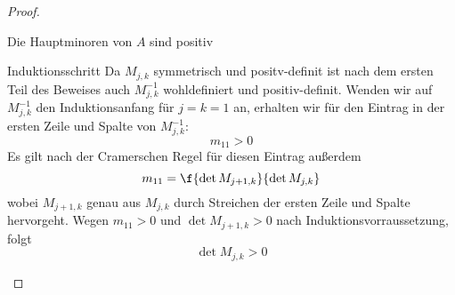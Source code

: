 \documentclass[a4paper]{scrartcl}
\numberwithin{equation}{section}
\begin{document}
\begin{st}
\begin{proof}
\begin{enumerate}
\begin{seg}{Die Hauptminoren von $A$ sind positiv}
\begin{seg}{Induktionsschritt}
					Da $M_{j,k}$ symmetrisch und positv-definit ist nach dem ersten Teil des Beweises auch $M_{j,k}^{-1}$ wohldefiniert und positiv-definit.
					Wenden wir auf $M_{j,k}^{-1}$ den Induktionsanfang für $j=k=1$ an, erhalten wir für den Eintrag in der ersten Zeile und Spalte von $M_{j,k}^{-1}$:
					\[
						m_{11} > 0
					\]
					Es gilt nach der Cramerschen Regel für diesen Eintrag außerdem
					\[
						m_{11} = \f {\det M_{j+1,k}}{\det M_{j,k}}
					\]
					wobei $M_{j+1,k}$ genau aus $M_{j,k}$ durch Streichen der ersten Zeile und Spalte hervorgeht.
					Wegen $m_{11}>0$ und $\det M_{j+1,k} > 0$ nach Induktionsvorraussetzung, folgt
					\[
						\det M_{j,k} > 0
					\]
				\end{seg}
			\end{seg}
		\end{enumerate}
	\end{proof}
\end{st}
\end{document}
